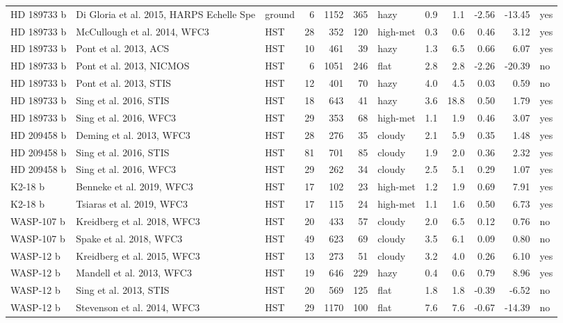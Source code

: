 \begin{table}[H]
\begin{tabular}{@{}lllrrrlrrrrl@{}}
HD 189733 b & Di Gloria et al. 2015, HARPS Echelle Spe & ground & 6 & 1152 & 365 & hazy & 0.9 & 1.1 & -2.56 & -13.45 & yes \\
HD 189733 b & McCullough et al. 2014, WFC3 & HST & 28 & 352 & 120 & high-met & 0.3 & 0.6 & 0.46 & 3.12 & yes \\
HD 189733 b & Pont et al. 2013, ACS & HST & 10 & 461 & 39 & hazy & 1.3 & 6.5 & 0.66 & 6.07 & yes \\
HD 189733 b & Pont et al. 2013, NICMOS & HST & 6 & 1051 & 246 & flat & 2.8 & 2.8 & -2.26 & -20.39 & no \\
HD 189733 b & Pont et al. 2013, STIS & HST & 12 & 401 & 70 & hazy & 4.0 & 4.5 & 0.03 & 0.59 & no \\
HD 189733 b & Sing et al. 2016, STIS & HST & 18 & 643 & 41 & hazy & 3.6 & 18.8 & 0.50 & 1.79 & yes \\
HD 189733 b & Sing et al. 2016, WFC3 & HST & 29 & 353 & 68 & high-met & 1.1 & 1.9 & 0.46 & 3.07 & yes \\
HD 209458 b & Deming et al. 2013, WFC3 & HST & 28 & 276 & 35 & cloudy & 2.1 & 5.9 & 0.35 & 1.48 & yes \\
HD 209458 b & Sing et al. 2016, STIS & HST & 81 & 701 & 85 & cloudy & 1.9 & 2.0 & 0.36 & 2.32 & yes \\
HD 209458 b & Sing et al. 2016, WFC3 & HST & 29 & 262 & 34 & cloudy & 2.5 & 5.1 & 0.29 & 1.07 & yes \\
K2-18 b & Benneke et al. 2019, WFC3 & HST & 17 & 102 & 23 & high-met & 1.2 & 1.9 & 0.69 & 7.91 & yes \\
K2-18 b & Tsiaras et al. 2019, WFC3 & HST & 17 & 115 & 24 & high-met & 1.1 & 1.6 & 0.50 & 6.73 & yes \\
WASP-107 b & Kreidberg et al. 2018, WFC3 & HST & 20 & 433 & 57 & cloudy & 2.0 & 6.5 & 0.12 & 0.76 & no \\
WASP-107 b & Spake et al. 2018, WFC3 & HST & 49 & 623 & 69 & cloudy & 3.5 & 6.1 & 0.09 & 0.80 & no \\
WASP-12 b & Kreidberg et al. 2015, WFC3 & HST & 13 & 273 & 51 & cloudy & 3.2 & 4.0 & 0.26 & 6.10 & yes \\
WASP-12 b & Mandell et al. 2013, WFC3 & HST & 19 & 646 & 229 & hazy & 0.4 & 0.6 & 0.79 & 8.96 & yes \\
WASP-12 b & Sing et al. 2013, STIS & HST & 20 & 569 & 125 & flat & 1.8 & 1.8 & -0.39 & -6.52 & no \\
WASP-12 b & Stevenson et al. 2014, WFC3 & HST & 29 & 1170 & 100 & flat & 7.6 & 7.6 & -0.67 & -14.39 & no \\

\end{tabular}
\end{table}
